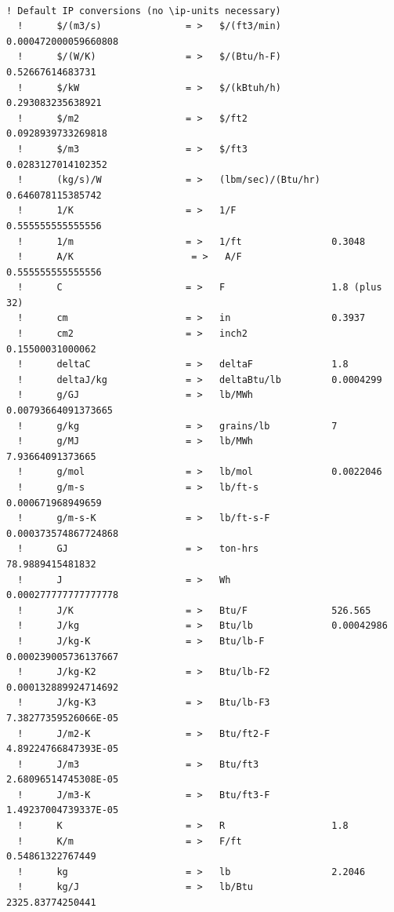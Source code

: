 \begin{lstlisting}

! Default IP conversions (no \ip-units necessary)
  !      $/(m3/s)               = >   $/(ft3/min)         0.000472000059660808
  !      $/(W/K)                = >   $/(Btu/h-F)         0.52667614683731
  !      $/kW                   = >   $/(kBtuh/h)         0.293083235638921
  !      $/m2                   = >   $/ft2               0.0928939733269818
  !      $/m3                   = >   $/ft3               0.0283127014102352
  !      (kg/s)/W               = >   (lbm/sec)/(Btu/hr)  0.646078115385742
  !      1/K                    = >   1/F                 0.555555555555556
  !      1/m                    = >   1/ft                0.3048
  !      A/K                     = >   A/F                 0.555555555555556
  !      C                      = >   F                   1.8 (plus 32)
  !      cm                     = >   in                  0.3937
  !      cm2                    = >   inch2               0.15500031000062
  !      deltaC                 = >   deltaF              1.8
  !      deltaJ/kg              = >   deltaBtu/lb         0.0004299
  !      g/GJ                   = >   lb/MWh              0.00793664091373665
  !      g/kg                   = >   grains/lb           7
  !      g/MJ                   = >   lb/MWh              7.93664091373665
  !      g/mol                  = >   lb/mol              0.0022046
  !      g/m-s                  = >   lb/ft-s             0.000671968949659
  !      g/m-s-K                = >   lb/ft-s-F           0.000373574867724868
  !      GJ                     = >   ton-hrs             78.9889415481832
  !      J                      = >   Wh                  0.000277777777777778
  !      J/K                    = >   Btu/F               526.565
  !      J/kg                   = >   Btu/lb              0.00042986
  !      J/kg-K                 = >   Btu/lb-F            0.000239005736137667
  !      J/kg-K2                = >   Btu/lb-F2           0.000132889924714692
  !      J/kg-K3                = >   Btu/lb-F3           7.38277359526066E-05
  !      J/m2-K                 = >   Btu/ft2-F           4.89224766847393E-05
  !      J/m3                   = >   Btu/ft3             2.68096514745308E-05
  !      J/m3-K                 = >   Btu/ft3-F           1.49237004739337E-05
  !      K                      = >   R                   1.8
  !      K/m                    = >   F/ft                0.54861322767449
  !      kg                     = >   lb                  2.2046
  !      kg/J                   = >   lb/Btu              2325.83774250441

\end{lstlisting}
